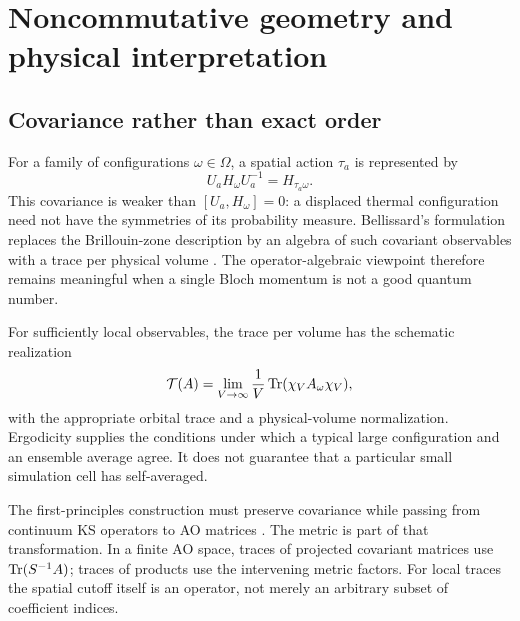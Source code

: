 \section{Noncommutative geometry and physical interpretation}
\label{sec:ncg}
\subsection{Covariance rather than exact order}
For a family of configurations $\omega\in\Omega$, a spatial action
$\tau_a$ is represented by
\begin{equation}
 U_a H_\omega U_a^{-1}=H_{\tau_a\omega}.
 \label{eq:covariance}
\end{equation}
This covariance is weaker than $[U_a,H_\omega]=0$: a displaced thermal
configuration need not have the symmetries of its probability measure.
Bellissard's formulation replaces the Brillouin-zone description by
an algebra of such covariant observables with a trace per physical
volume \cite{Bellissard1994}. The operator-algebraic viewpoint therefore
remains meaningful when a single Bloch momentum is not a good quantum
number.

For sufficiently local observables, the trace per volume has the
schematic realization
\begin{equation}
 \mathcal T(A)=
 \lim_{V\rightarrow\infty}\frac{1}{V}
 \operatorname{Tr}(\chi_V A_\omega\chi_V),
 \label{eq:trace-volume}
\end{equation}
with the appropriate orbital trace and a physical-volume normalization.
Ergodicity supplies the conditions under which a typical large
configuration and an ensemble average agree. It does not guarantee
that a particular small simulation cell has self-averaged.

The first-principles construction must preserve covariance while
passing from continuum KS operators to AO matrices
\cite{KuehneTransport2020}. The metric is part of that transformation.
In a finite AO space, traces of projected covariant matrices use
$\operatorname{Tr}(S^{-1}A)$; traces of products use the intervening metric factors.
For local traces the spatial cutoff itself is an operator, not merely
an arbitrary subset of coefficient indices.

